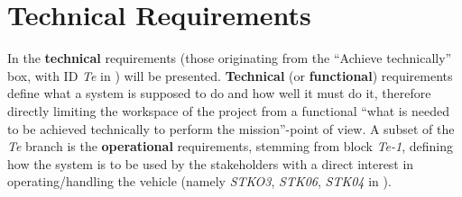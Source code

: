\section{Technical Requirements}\label{sec:technical-requirements}
In  the \textbf{technical} requirements (those originating from the \enquote{Achieve technically} box, with ID \textit{Te} in ) will be presented. \textbf{Technical} (or \textbf{functional}) requirements define what a system is supposed to do and how well it must do it, therefore directly limiting the workspace of the project from a functional \enquote{what is needed to be achieved technically to perform the mission}-point of view.
A subset of the \textit{Te} branch is the \textbf{operational} requirements, stemming from block \textit{Te-1}, defining how the system is to be used by the stakeholders with a direct interest in operating/handling the vehicle (namely \textit{STKO3}, \textit{STK06}, \textit{STK04} in ).
